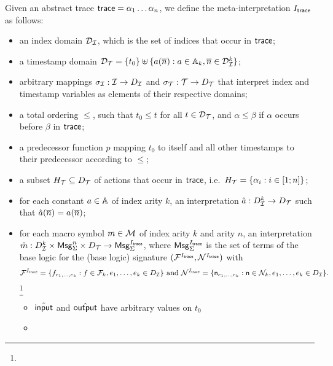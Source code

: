 \begin{definition}
  Given an abstract trace $\textsf{trace} = \alpha_1\ldots\alpha_n$,
  we define the meta-interpretation $I_{\textsf{trace}}$ as follows:
  \begin{itemize}
    \item an index domain $\mathcal{D}_{\mathcal{I}}$, which is the set of indices that occur in $\textsf{trace}$;
    \item a timestamp domain $\mathcal{D}_{\mathcal{T}} = \{ t_0 \} \uplus \{ a(\overline{n}) : a\in\mathbb{A}_k,
      \overline{n}\in\mathcal{D}_{\mathcal{I}}^k \}$;
    \item arbitrary mappings $\sigma_{\mathcal{I}} : \mathcal{I} \to D_{\mathcal{I}}$
      and $\sigma_{\mathcal{T}} : \mathcal{T} \to D_{\mathcal{T}}$ that interpret index and
      timestamp variables as elements of their respective domains;
    \item a total ordering $\leq$, such that $t_0\leq t$ for all $t\in\mathcal{D}_{\mathcal{T}}$,
      and $\alpha\leq\beta$ if $\alpha$ occurs before $\beta$ in $\textsf{trace}$;
    \item a predecessor function $p$ mapping $t_0$ to itself and all
      other timestamps to their predecessor according to $\leq$;
    \item a subset $H_{\mathcal{T}}\subseteq D_{\mathcal{T}}$  of actions that occur in $\textsf{trace}$,
      i.e.\ $H_{\mathcal{T}}=\{\alpha_i : i\in[1;n]\}$;
    \item for each constant $a \in \mathbb{A}$ of index arity $k$,
    an interpretation $\hat{a} : D_{\mathcal{I}}^k \to D_{\mathcal{T}}$ such that
    $\hat{a}(\overline{n}) = a(\overline{n})$;
    \item for each macro symbol $m \in \mathcal{M}$ of index
      arity $k$ and arity $n$, an interpretation
      $\hat{m} : D_{\mathcal{I}}^k \times \mathsf{Msg}_\Sigma^n \times D_{\mathcal{T}} \to \mathsf{Msg}^{I_{\textsf{trace}}}_\Sigma$,
      where $\mathsf{Msg}^{I_{\textsf{trace}}}_\Sigma$ is the set of terms of the base
      logic for the (base logic) signature
      $(\mathcal{F}^{I_{\textsf{trace}}},\mathcal{N}^{I_{\textsf{trace}}})$ with
      $$\mathcal{F}^{I_{\textsf{trace}}} =
        \{ f_{e_1,\ldots,e_k} : f \in \mathcal{F}_k, e_1,\ldots,e_k \in D_{\mathcal{I}} \}
        \text{ and }
        \mathcal{N}^{I_{\textsf{trace}}} = \{ \mathsf{n}_{e_1,\ldots,e_k} : \mathsf{n}\in\mathcal{N}_k,
        e_1,\ldots,e_k\in D_{\mathcal{I}} \}.$$
      \footnote{}
    \begin{itemize}
      \item $\hat{\textsf{input}}$ and $\hat{\textsf{output}}$ have arbitrary values on $t_0$
      \item {}
\end{itemize}
\end{itemize}
\end{definition}
